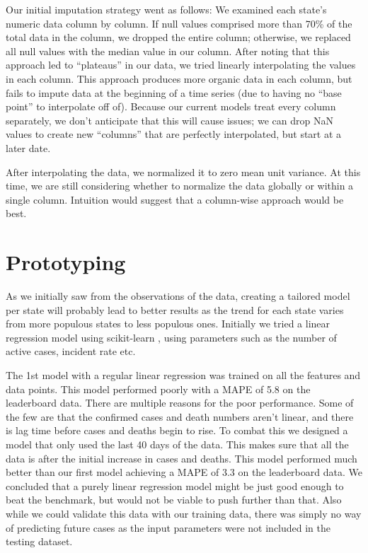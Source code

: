 \documentclass[sigconf]{acmart}
\begin{document}
Our initial imputation strategy went as follows: 
We examined each state’s numeric data column by column. If null values
comprised more than 70\% of the total data in the column, we dropped the entire
column; otherwise, we replaced all null values with the median value in our
column. 
After noting that this approach led to “plateaus” in our data, we tried
linearly interpolating the values in each column. This approach produces more
organic data in each column, but fails to impute data at the beginning of a
time series (due to having no “base point” to interpolate off of). Because our
current models treat every column separately, we don’t anticipate that this
will cause issues; we can drop NaN values to create new “columns” that are
perfectly interpolated, but start at a later date.  

After interpolating the data, we normalized it to zero mean unit variance. At
this time, we are still considering whether to normalize the data globally or
within a single column. Intuition would suggest that a column-wise approach
would be best.

\section{Prototyping}

As we initially saw from the observations of the data, creating a tailored
model per state will probably lead to better results as the trend for each
state varies from more populous states to less populous ones. Initially we
tried a linear regression model using scikit-learn \cite{scikit-learn}, using
parameters such as the number of active cases, incident rate etc. 

The 1st model with a regular linear regression was trained on all the features
and data points. This model performed poorly with a MAPE of 5.8 on the
leaderboard data. There are multiple reasons for the poor performance. Some of
the few are that the confirmed cases and death numbers aren't linear, and there
is lag time before cases and deaths begin to rise. To combat this we designed a
model that only used the last 40 days of the data. This makes sure that all the
data is after the initial increase in cases and deaths. This model performed
much better than our first model achieving a MAPE of 3.3 on the leaderboard
data. We concluded that a purely linear regression model might be just good
enough to beat the benchmark, but would not be viable to push further than
that.  Also while we could validate this data with our training data, there was
simply no way of predicting future cases as the input parameters were not
included in the testing dataset. 
\end{document}
